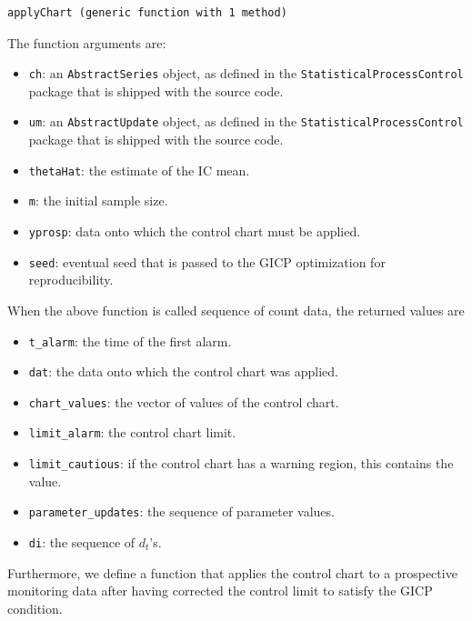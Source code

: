 \documentclass[12pt,a4paper]{article}
\begin{document}
\begin{lstlisting}
applyChart (generic function with 1 method)
\end{lstlisting}


The function arguments are:

\begin{itemize}
\item \texttt{ch}: an \texttt{AbstractSeries} object, as defined in the \texttt{StatisticalProcessControl} package that is shipped with the source code.


\item \texttt{um}: an \texttt{AbstractUpdate} object, as defined in the \texttt{StatisticalProcessControl} package that is shipped with the source code.


\item \texttt{thetaHat}: the estimate of the IC mean.


\item \texttt{m}: the initial sample size.


\item \texttt{yprosp}: data onto which the control chart must be applied.


\item \texttt{seed}: eventual seed that is passed to the GICP optimization for reproducibility. 

\end{itemize}
When the above function is called sequence of count data, the returned values are

\begin{itemize}
\item \texttt{t\_alarm}: the time of the first alarm.


\item \texttt{dat}: the data onto which the control chart was applied.


\item \texttt{chart\_values}: the vector of values of the control chart.


\item \texttt{limit\_alarm}: the control chart limit.


\item \texttt{limit\_cautious}: if the control chart has a warning region, this contains the value.


\item \texttt{parameter\_updates}: the sequence of parameter values.


\item \texttt{di}: the sequence of $d_t$'s.

\end{itemize}
Furthermore, we define a function that applies the control chart to a prospective monitoring data after having corrected the control limit to satisfy the GICP condition.
\end{document}
